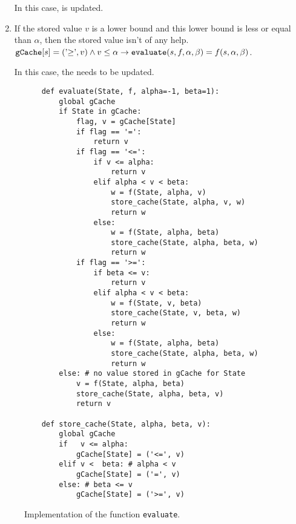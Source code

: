 \begin{enumerate}
      In this case,  is updated.    
\item If the stored value $v$ is a lower bound and this lower bound is less or equal than $\alpha$, then the
      stored value isn't of any help. 
      \\[0.2cm]
      \hspace*{1.3cm}
      $\texttt{gCache}[s] = (\mbox{'$\geq$'}, v) \wedge v \leq \alpha \rightarrow 
      \texttt{evaluate}(s, f, \alpha, \beta) = f(s, \alpha, \beta)$.

      In this case, the  needs to be updated.
\end{enumerate}

\begin{figure}[!ht]
\centering
\begin{verbatim}
    def evaluate(State, f, alpha=-1, beta=1):
        global gCache
        if State in gCache:
            flag, v = gCache[State]
            if flag == '=':
                return v
            if flag == '<=':
                if v <= alpha:
                    return v
                elif alpha < v < beta:
                    w = f(State, alpha, v)
                    store_cache(State, alpha, v, w)
                    return w
                else: 
                    w = f(State, alpha, beta)
                    store_cache(State, alpha, beta, w)
                    return w
            if flag == '>=':
                if beta <= v:
                    return v
                elif alpha < v < beta:
                    w = f(State, v, beta)
                    store_cache(State, v, beta, w)
                    return w
                else:
                    w = f(State, alpha, beta)
                    store_cache(State, alpha, beta, w)
                    return w
        else: # no value stored in gCache for State
            v = f(State, alpha, beta)
            store_cache(State, alpha, beta, v)
            return v

    def store_cache(State, alpha, beta, v):
        global gCache
        if   v <= alpha:
            gCache[State] = ('<=', v)
        elif v <  beta: # alpha < v
            gCache[State] = ('=', v)
        else: # beta <= v
            gCache[State] = ('>=', v)            
\end{verbatim}
\vspace*{-0.3cm}
\caption{Implementation of the function \texttt{evaluate}.}
\label{fig:evaluate}
\end{figure}
\FloatBarrier

